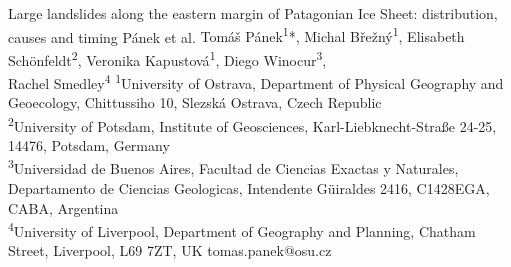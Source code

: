 \abstract
{Large landslides along the eastern margin of Patagonian Ice Sheet: distribution, causes and timing} %
{Pánek et al.} %
{Tomáš Pánek\textsuperscript{1}*, Michal Břežný\textsuperscript{1}, Elisabeth Schönfeldt\textsuperscript{2}, Veronika Kapustová\textsuperscript{1}, Diego Winocur\textsuperscript{3}, \\Rachel Smedley\textsuperscript{4}} %
{\TLtag} %
{\textsuperscript{1}University of Ostrava, Department of Physical Geography and Geoecology, Chittussiho 10, Slezská Ostrava, Czech Republic \\
\textsuperscript{2}University of Potsdam, Institute of Geosciences, Karl-Liebknecht-Straße 24-25, 14476, Potsdam, Germany \\
\textsuperscript{3}Universidad de Buenos Aires, Facultad de Ciencias Exactas y Naturales, Departamento de Ciencias Geologicas, Intendente Güiraldes 2416, C1428EGA, CABA, Argentina \\
\textsuperscript{4}University of Liverpool, Department of Geography and Planning, Chatham Street, Liverpool, L69 7ZT, UK} %
{tomas.panek@osu.cz}  %
{}%
